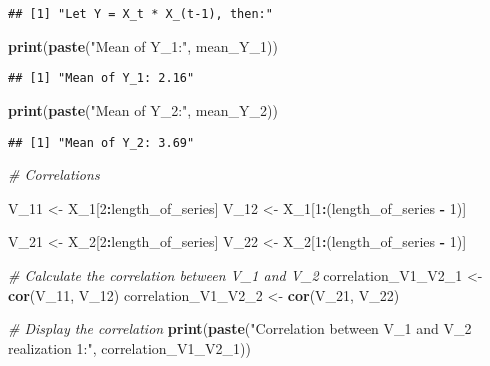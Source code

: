 \documentclass[
]{article}
\newenvironment{Shaded}{\begin{snugshade}}{\end{snugshade}}
\newcommand{\CommentTok}[1]{\textcolor[rgb]{0.56,0.35,0.01}{\textit{#1}}}
\newcommand{\DecValTok}[1]{\textcolor[rgb]{0.00,0.00,0.81}{#1}}
\newcommand{\FunctionTok}[1]{\textcolor[rgb]{0.13,0.29,0.53}{\textbf{#1}}}
\newcommand{\NormalTok}[1]{#1}
\newcommand{\OtherTok}[1]{\textcolor[rgb]{0.56,0.35,0.01}{#1}}
\newcommand{\SpecialCharTok}[1]{\textcolor[rgb]{0.81,0.36,0.00}{\textbf{#1}}}
\newcommand{\StringTok}[1]{\textcolor[rgb]{0.31,0.60,0.02}{#1}}
\begin{document}
\begin{verbatim}
## [1] "Let Y = X_t * X_(t-1), then:"
\end{verbatim}

\begin{Shaded}
\begin{Highlighting}[]
\FunctionTok{print}\NormalTok{(}\FunctionTok{paste}\NormalTok{(}\StringTok{"Mean of Y\_1:"}\NormalTok{, mean\_Y\_1))}
\end{Highlighting}
\end{Shaded}

\begin{verbatim}
## [1] "Mean of Y_1: 2.16"
\end{verbatim}

\begin{Shaded}
\begin{Highlighting}[]
\FunctionTok{print}\NormalTok{(}\FunctionTok{paste}\NormalTok{(}\StringTok{"Mean of Y\_2:"}\NormalTok{, mean\_Y\_2))}
\end{Highlighting}
\end{Shaded}

\begin{verbatim}
## [1] "Mean of Y_2: 3.69"
\end{verbatim}

\begin{Shaded}
\begin{Highlighting}[]
\CommentTok{\# Correlations}

\NormalTok{V\_11 }\OtherTok{\textless{}{-}}\NormalTok{ X\_1[}\DecValTok{2}\SpecialCharTok{:}\NormalTok{length\_of\_series]}
\NormalTok{V\_12 }\OtherTok{\textless{}{-}}\NormalTok{ X\_1[}\DecValTok{1}\SpecialCharTok{:}\NormalTok{(length\_of\_series }\SpecialCharTok{{-}} \DecValTok{1}\NormalTok{)]}

\NormalTok{V\_21 }\OtherTok{\textless{}{-}}\NormalTok{ X\_2[}\DecValTok{2}\SpecialCharTok{:}\NormalTok{length\_of\_series]}
\NormalTok{V\_22 }\OtherTok{\textless{}{-}}\NormalTok{ X\_2[}\DecValTok{1}\SpecialCharTok{:}\NormalTok{(length\_of\_series }\SpecialCharTok{{-}} \DecValTok{1}\NormalTok{)]}

\CommentTok{\# Calculate the correlation between V\_1 and V\_2}
\NormalTok{correlation\_V1\_V2\_1 }\OtherTok{\textless{}{-}} \FunctionTok{cor}\NormalTok{(V\_11, V\_12)}
\NormalTok{correlation\_V1\_V2\_2 }\OtherTok{\textless{}{-}} \FunctionTok{cor}\NormalTok{(V\_21, V\_22)}

\CommentTok{\# Display the correlation}
\FunctionTok{print}\NormalTok{(}\FunctionTok{paste}\NormalTok{(}\StringTok{"Correlation between V\_1 and V\_2 realization 1:"}\NormalTok{, correlation\_V1\_V2\_1))}
\end{Highlighting}
\end{Shaded}
\end{document}
